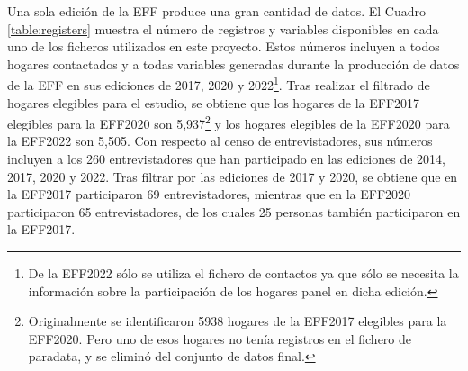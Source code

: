 Una sola edición de la EFF produce una gran cantidad de datos. El Cuadro \ref{table:registers} muestra el número de registros y variables disponibles en cada uno de los ficheros utilizados en este proyecto. Estos números incluyen a todos hogares contactados y a todas variables generadas durante la producción de datos de la EFF en sus ediciones de 2017, 2020 y 2022\footnote{De la EFF2022 sólo se utiliza el fichero de contactos ya que sólo se necesita la información sobre la participación de los hogares panel en dicha edición.}. Tras realizar el filtrado de hogares elegibles para el estudio, se obtiene que los hogares de la EFF2017 elegibles para la EFF2020 son 5,937\footnote{Originalmente se identificaron 5938 hogares de la EFF2017 elegibles para la EFF2020. Pero uno de esos hogares no tenía registros en el fichero de paradata, y se eliminó del conjunto de datos final.} y los hogares elegibles de la EFF2020 para la EFF2022 son 5,505. Con respecto al censo de entrevistadores, sus números incluyen a los 260 entrevistadores que han participado en las ediciones de 2014, 2017, 2020 y 2022. Tras filtrar por las ediciones de 2017 y 2020, se obtiene que en la EFF2017 participaron 69 entrevistadores, mientras que en la EFF2020 participaron 65 entrevistadores, de los cuales 25 personas también participaron en la EFF2017.

